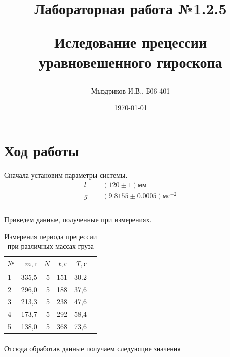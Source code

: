 \documentclass[a4paper, 12pt]{article}
\title{\begin{center}Лабораторная работа №1.2.5\end{center}
Иследование прецессии уравновешенного гироскопа}
\author{Мыздриков И.В., Б06-401}
\date{\today}
\begin{document}
    \maketitle
    \newpage

    \section{Ход работы}
    \paragraph{}
    Сначала установим параметры системы.
    \begin{align*}
     l&=(120\pm1)мм\\
     g&=(9.8155\pm0.0005)мс^{-2}\\
    \end{align*}

    \paragraph{}
    Приведем данные, полученные при измерениях.

    \begin{table}[h!]
        \begin{center}
        \begin{tabular}{|l|r|r|r|r|r|}
        \hline
        $№$ & $m, г$ &   $N$ & $t, с$ & $T, с$\\\hline
        1  &  335,5 &  5 &  151 & 30.2 \\
        2  &  296,0 &  5 &  188 & 37,6 \\
        3  &  213,3 &  5 &  238 & 47,6 \\
        4  &  173,7 &  5 &  292 & 58,4 \\
        5  &  138,0 &  5 &  368 & 73,6 \\
      
        \hline
        \end{tabular}
         \caption{Измерения периода прецессии при различных массах груза}
        \end{center}

    \end{table}

    \paragraph{}
    Отсюда обработав данные получаем следующие значения
\end{document}
